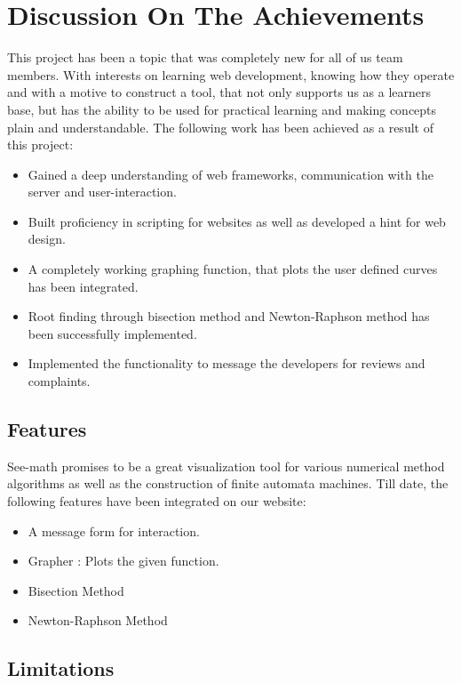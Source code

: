 \chapter{Discussion On The Achievements}

This project has been a topic that was completely new for all of us team members. With interests on learning web development, knowing how they operate and with a motive to construct a tool, that not only supports us as a learners base, but has the ability to be used for practical learning and making concepts plain and understandable. The following work has been achieved as a result of this project:
\begin{itemize}
	\item Gained a deep understanding of web frameworks, communication with the server and user-interaction.
	\item Built proficiency in scripting for websites as well as developed a hint for web design.
	\item A completely working graphing function, that plots the user defined curves has been integrated.
	\item Root finding through bisection method and Newton-Raphson method has been successfully implemented.
	\item Implemented the functionality to message the developers for reviews and complaints.
\end{itemize}


\section{{\bf{Features}}}

See-math promises to be a great visualization tool for various numerical method algorithms as well as the construction of finite automata machines. Till date, the following features have been integrated on our website:
\begin{itemize}
	\item A message form for interaction.
	\item Grapher : Plots the given function.
	\item Bisection Method
	\item Newton-Raphson Method
\end{itemize}

\section{{\bf{Limitations}}}


